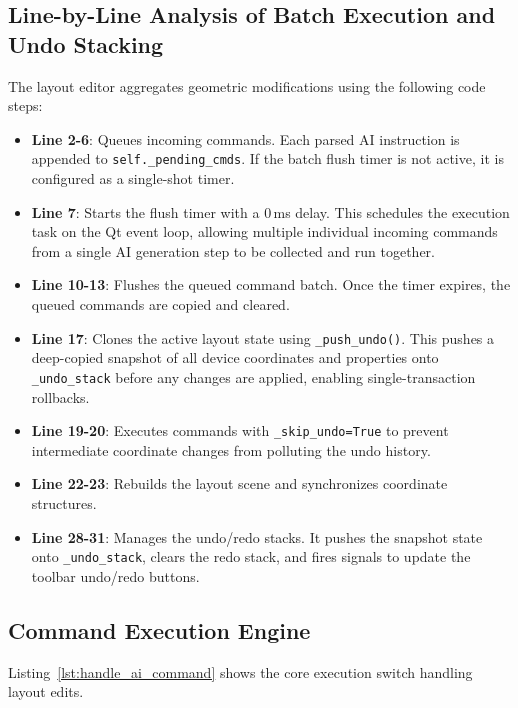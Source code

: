 \subsection{Line-by-Line Analysis of Batch Execution and Undo Stacking}
The layout editor aggregates geometric modifications using the following code steps:
\begin{itemize}
    \item \textbf{Line 2-6}: Queues incoming commands. Each parsed AI instruction is appended to \texttt{self.\_pending\_cmds}. If the batch flush timer is not active, it is configured as a single-shot timer.
    \item \textbf{Line 7}: Starts the flush timer with a $0$\,ms delay. This schedules the execution task on the Qt event loop, allowing multiple individual incoming commands from a single AI generation step to be collected and run together.
    \item \textbf{Line 10-13}: Flushes the queued command batch. Once the timer expires, the queued commands are copied and cleared.
    \item \textbf{Line 17}: Clones the active layout state using \texttt{\_push\_}\allowbreak\texttt{undo()}. This pushes a deep-copied snapshot of all device coordinates and properties onto \texttt{\_undo\_stack} before any changes are applied, enabling single-transaction rollbacks.
    \item \textbf{Line 19-20}: Executes commands with \texttt{\_skip\_undo=True} to prevent intermediate coordinate changes from polluting the undo history.
    \item \textbf{Line 22-23}: Rebuilds the layout scene and synchronizes coordinate structures.
    \item \textbf{Line 28-31}: Manages the undo/redo stacks. It pushes the snapshot state onto \texttt{\_undo\_stack}, clears the redo stack, and fires signals to update the toolbar undo/redo buttons.
\end{itemize}

\subsection{Command Execution Engine}
Listing~\ref{lst:handle_ai_command} shows the core execution switch handling layout edits.

